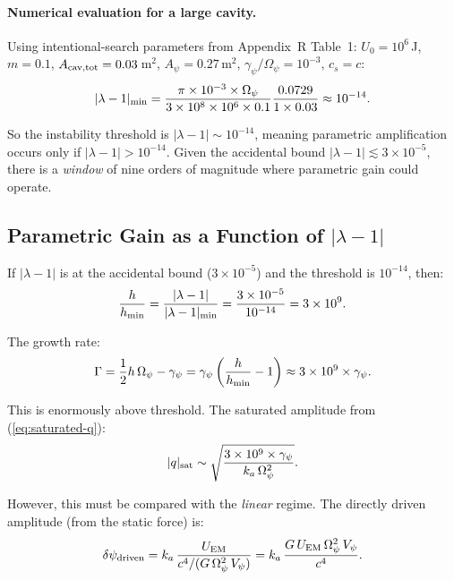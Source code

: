 \documentclass[11pt]{article}
\newcommand{\ka}{k_a}
\begin{document}
\paragraph{Numerical evaluation for a large cavity.}
Using intentional-search parameters from Appendix~R Table~1:
$U_0 = 10^6$\,J, $m = 0.1$, $A_{\rm cav,tot} = 0.03$\,m$^2$,
$A_\psi = 0.27$\,m$^2$, $\gamma_\psi/\Omega_\psi = 10^{-3}$,
$c_s = c$:
\begin{equation}
|\lambda - 1|_{\rm min}
  = \frac{\pi \times 10^{-3} \times \Omega_\psi}{3 \times 10^8 \times 10^6
    \times 0.1}
  \frac{0.0729}{1 \times 0.03}
  \approx 10^{-14}.
\end{equation}

So the instability threshold is $|\lambda - 1| \sim 10^{-14}$, meaning
parametric amplification occurs only if $|\lambda - 1| > 10^{-14}$.
Given the accidental bound $|\lambda - 1| \lesssim 3 \times 10^{-5}$,
there is a \textit{window} of nine orders of magnitude where parametric
gain could operate.

\subsection{Parametric Gain as a Function of $|\lambda - 1|$}

If $|\lambda - 1|$ is at the accidental bound ($3 \times 10^{-5}$) and
the threshold is $10^{-14}$, then:
\begin{equation}
\frac{h}{h_{\rm min}} = \frac{|\lambda - 1|}{|\lambda - 1|_{\rm min}}
  = \frac{3 \times 10^{-5}}{10^{-14}} = 3 \times 10^9.
\end{equation}

The growth rate:
\begin{equation}
\Gamma = \frac{1}{2}h\,\Omega_\psi - \gamma_\psi
  = \gamma_\psi\left(\frac{h}{h_{\rm min}} - 1\right)
  \approx 3 \times 10^9 \times \gamma_\psi.
\end{equation}

This is enormously above threshold. The saturated amplitude from
(\ref{eq:saturated-q}):
\begin{equation}
|q|_{\rm sat} \sim \sqrt{\frac{3 \times 10^9 \times \gamma_\psi}
  {\ka\,\Omega_\psi^2}}.
\end{equation}

However, this must be compared with the \textit{linear} regime. The
directly driven amplitude (from the static force) is:
\begin{equation}
\delta\psi_{\rm driven}
  = \ka\,\frac{U_{\rm EM}}{c^4/(G\,\Omega_\psi^2\,V_\psi)}
  = \ka\,\frac{G\,U_{\rm EM}\,\Omega_\psi^2\,V_\psi}{c^4}.
\end{equation}
\end{document}
